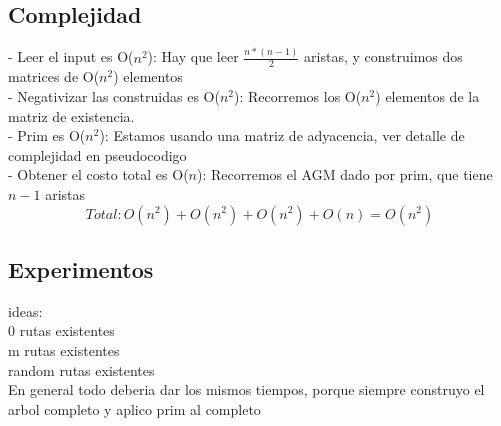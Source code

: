 \subsection{Complejidad}

- Leer el input es O($n^2$): Hay que leer $\frac{n*(n-1)}{2}$ aristas, y construimos dos matrices de O($n^2$) elementos \\

- Negativizar las construidas es O($n^2$): Recorremos los O($n^2$) elementos de la matriz de existencia. \\

- Prim es O($n^2$): Estamos usando una matriz de adyacencia, ver detalle de complejidad en pseudocodigo\\

- Obtener el costo total es O($n$): Recorremos el AGM dado por prim, que tiene $n-1$ aristas \\

$$Total:  O(n^2) + O(n^2) + O(n^2) + O(n) = O(n^2) $$

\subsection{Experimentos}

ideas:\\
0 rutas existentes\\
m rutas existentes\\
random rutas existentes\\

En general todo deberia dar los mismos tiempos, porque siempre construyo el arbol completo y aplico prim al completo